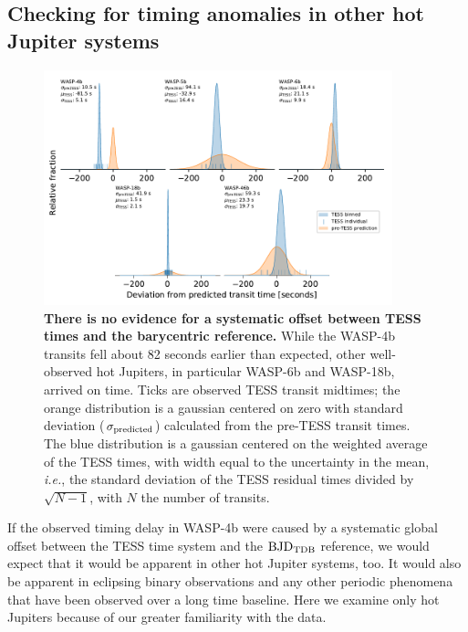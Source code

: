 \documentclass[12pt,twocolumn,tighten]{aastex62}
\begin{document}
\subsection{Checking for timing anomalies in other hot Jupiter systems}
\label{sec:hj_verification}

\begin{figure}[ht!]
  \begin{center}
    \leavevmode
    \includegraphics[width=0.9\textwidth]{f7.pdf}
  \end{center}
  \vspace{-0.5cm}
  \caption{
    {\bf There is no evidence for a systematic offset between TESS
    times and the barycentric reference.} While the WASP-4b transits
    fell about 82 seconds earlier than expected, other well-observed
    hot Jupiters, in particular WASP-6b and WASP-18b, arrived on time.
    Ticks are observed TESS transit midtimes; the orange distribution
    is a gaussian centered on zero with standard deviation
    ($\sigma_{\rm predicted}$) calculated from the pre-TESS transit
    times.  The blue distribution is a gaussian centered on the
    weighted average of the TESS times, with width equal to the
    uncertainty in the mean, {\it i.e.}, the standard deviation
    of the TESS residual times divided by $\sqrt{N-1}$, with $N$ the
    number of transits.
    \label{fig:hjs}
  }
\end{figure}

If the observed timing delay in WASP-4b were caused by a systematic
global offset between the TESS time system and the ${\rm BJD}_{\rm
TDB}$ reference, we would expect that it would be apparent in other
hot Jupiter systems, too. It would also be apparent in eclipsing
binary observations and any other periodic phenomena that have been
observed over a long time baseline. Here we examine only hot Jupiters
because of our greater familiarity with the data.
\end{document}
